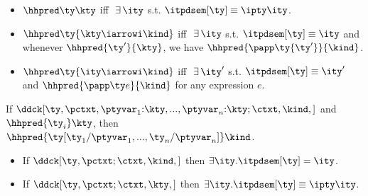 {\begin{definition}
\label{def:pd-props}
\begin{itemize}
\item $\hhpred \ty \kty$ iff $\ \exists\,\ity$ s.t. $\itpdsem[\ty] \equiv
  {\ipty \ity}$.
\item $\hhpred \ty {\kty \iarrowi \kind}$ iff $\ \exists\,\ity$
  s.t. $\itpdsem[\ty] \equiv \ity$ and whenever $\hhpred
  {\ty'}{\kty}$, we have $\hhpred {\papp \ty {\ty'}}{\kind}$.
\item $\hhpred \ty {\ity \iarrowi \kind}$ iff $\ \exists\,\ity'$
  s.t. $\itpdsem[\ty] \equiv \ity'$ and $\hhpred{\papp \ty e}{\kind}$
  for any expression $e$.
\end{itemize}
\end{definition}
\begin{lemma}
\label{lemma:pd-log-rel}
   If
   $\ddck[\ty,{\pctxt,\ptyvar_1{:}\kty,...,\ptyvar_n{:}\kty;\ctxt},\kind,{}]$ 
   and $\hhpred {\ty_i} \kty$, then \\ 
   $\hhpred {\ty[\ty_1/\ptyvar_1,...,\ty_n/\ptyvar_n]} \kind$.
\end{lemma}

\begin{lemma}
\label{lemma:pd-props}
  \begin{itemize}
  \item If $\ddck[\ty,\pctxt;\ctxt,\kind,{}]$ then $\exists
     \ity.\itpdsem[\ty] = \ity$.
   \item If $\ddck[\ty,\pctxt;\ctxt,\kty,{}]$ then $\exists
     \ity.\itpdsem[\ty] \equiv \ipty \ity$.
  \end{itemize}
\end{lemma}


\trversion{
\begin{definition}
$\pda \ptyvar = \ipty \ptyvar$
\end{definition}

}}

